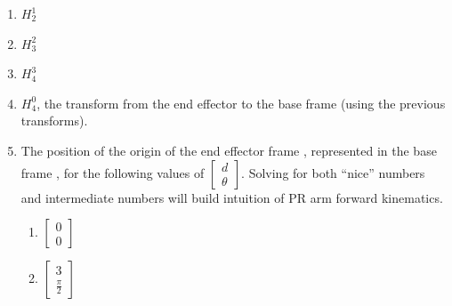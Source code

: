 \documentclass{16384_doc}
\begin{document}
\begin{questions}
\begin{enumerate} [label=\alph*.]
        \item \text{[1 point]} $H_2^1$ %
        \begin{tcolorbox}[height=3cm]
        \end{tcolorbox}
        
        \item \text{[1 point]} $H_3^2$ %
        \begin{tcolorbox}[height=3cm]
        \end{tcolorbox}
        
        \item \text{[1 point]} $H_4^3$ %
        \begin{tcolorbox}[height=3cm]
        \end{tcolorbox}
        
        \item \text{[1 point]} $H_4^0$, the transform from the end effector to the base frame (using the previous transforms).
        \begin{tcolorbox}[height=3cm]
        \end{tcolorbox}


    \item \text{[4 points]} The position of the origin of the end effector frame , represented in the base frame , for the following values of
    $\begin{bmatrix} d \\ \theta \end{bmatrix}$. Solving for both ``nice'' numbers and intermediate numbers will build 
    intuition of PR arm forward kinematics.

        \begin{enumerate} [label=(\roman*)]
            \item $\begin{bmatrix} 0 \\ 0 \end{bmatrix}$ %

            \item $\begin{bmatrix} 3 \\ \frac\pi2 \end{bmatrix}$ %


\end{enumerate}
\end{enumerate}
\end{questions}
\end{document}
